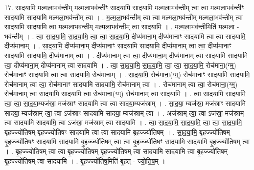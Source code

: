 \documentclass[17pt]{extarticle}
\begin{document}
17. सा॒द॒या॒मि॒ म॒ल्म॒ला॒भव॑न्तीम् मल्मला॒भव॑न्तीꣳ सादयामि सादयामि मल्मला॒भव॑न्तीम् त्वा त्वा मल्मला॒भव॑न्तीꣳ सादयामि सादयामि मल्मला॒भव॑न्तीम् त्वा । . म॒ल्म॒ला॒भव॑न्तीम् त्वा त्वा मल्मला॒भव॑न्तीम् मल्मला॒भव॑न्तीम् त्वा सादयामि सादयामि त्वा मल्मला॒भव॑न्तीम् मल्मला॒भव॑न्तीम् त्वा सादयामि । . म॒ल्म॒ला॒भव॑न्ती॒मिति॑ मल्मला - भव॑न्तीम् । . त्वा॒ सा॒द॒या॒मि॒ सा॒द॒या॒मि॒ त्वा॒ त्वा॒ सा॒द॒या॒मि॒ दीप्य॑माना॒म् दीप्य॑मानाꣳ सादयामि त्वा त्वा सादयामि॒ दीप्य॑मानाम् । . सा॒द॒या॒मि॒ दीप्य॑माना॒म् दीप्य॑मानाꣳ सादयामि सादयामि॒ दीप्य॑मानाम् त्वा त्वा॒ दीप्य॑मानाꣳ सादयामि सादयामि॒ दीप्य॑मानाम् त्वा । . दीप्य॑मानाम् त्वा त्वा॒ दीप्य॑माना॒म् दीप्य॑मानाम् त्वा सादयामि सादयामि त्वा॒ दीप्य॑माना॒म् दीप्य॑मानाम् त्वा सादयामि । . त्वा॒ सा॒द॒या॒मि॒ सा॒द॒या॒मि॒ त्वा॒ त्वा॒ सा॒द॒या॒मि॒ रोच॑माना॒(ग्म्॒) रोच॑मानाꣳ सादयामि त्वा त्वा सादयामि॒ रोच॑मानाम् । . सा॒द॒या॒मि॒ रोच॑माना॒(ग्म्॒) रोच॑मानाꣳ सादयामि सादयामि॒ रोच॑मानाम् त्वा त्वा॒ रोच॑मानाꣳ सादयामि सादयामि॒ रोच॑मानाम् त्वा । . रोच॑मानाम् त्वा त्वा॒ रोच॑माना॒(ग्म्॒) रोच॑मानाम् त्वा सादयामि सादयामि त्वा॒ रोच॑माना॒(ग्म्॒) रोच॑मानाम् त्वा सादयामि । . त्वा॒ सा॒द॒या॒मि॒ सा॒द॒या॒मि॒ त्वा॒ त्वा॒ सा॒द॒या॒म्यज॑स्रा॒ मज॑स्राꣳ सादयामि त्वा त्वा सादया॒म्यज॑स्राम् । . सा॒द॒या॒ म्यज॑स्रा॒ मज॑स्राꣳ सादयामि सादया॒ म्यज॑स्राम् त्वा॒ त्वा ऽज॑स्राꣳ सादयामि सादया॒ म्यज॑स्राम् त्वा । . अज॑स्राम् त्वा॒ त्वा ऽज॑स्रा॒ मज॑स्राम् त्वा सादयामि सादयामि॒ त्वा ऽज॑स्रा॒ मज॑स्राम् त्वा सादयामि । . त्वा॒ सा॒द॒या॒मि॒ सा॒द॒या॒मि॒ त्वा॒ त्वा॒ सा॒द॒या॒मि॒ बृ॒हज्ज्यो॑तिषम् बृ॒हज्ज्यो॑तिषꣳ सादयामि त्वा त्वा सादयामि बृ॒हज्ज्यो॑तिषम् । . सा॒द॒या॒मि॒ बृ॒हज्ज्यो॑तिषम् बृ॒हज्ज्यो॑तिषꣳ सादयामि सादयामि बृ॒हज्ज्यो॑तिषम् त्वा त्वा बृ॒हज्ज्यो॑तिषꣳ सादयामि सादयामि बृ॒हज्ज्यो॑तिषम् त्वा । . बृ॒हज्ज्यो॑तिषम् त्वा त्वा बृ॒हज्ज्यो॑तिषम् बृ॒हज्ज्यो॑तिषम् त्वा सादयामि सादयामि त्वा बृ॒हज्ज्यो॑तिषम् बृ॒हज्ज्यो॑तिषम् त्वा सादयामि । . बृ॒हज्ज्यो॑तिष॒मिति॑ बृ॒हत् - ज्यो॒ति॒ष॒म् । \newline
\end{document}
